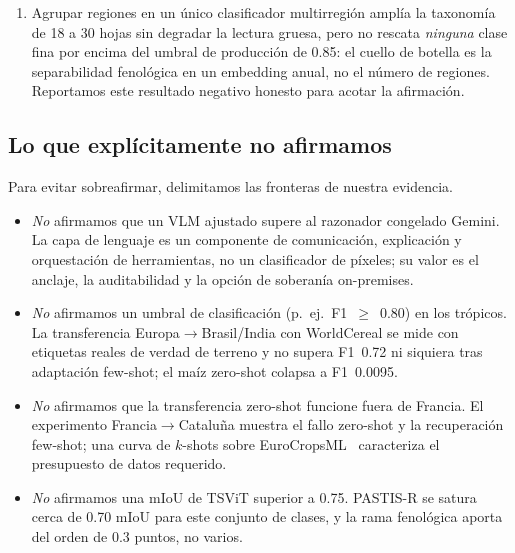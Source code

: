 \begin{enumerate}[leftmargin=*]
    reportados~\cite{harvesting2026alphaearth}. Aun así, la transferencia
    \emph{sí} funciona donde la fenología es separable --- el campeón
    entrenado en Francia alcanza F1 macro 0.266 en Baja Sajonia (DE4),
    rescatando los cereales de invierno --- y el modelo de fundación
    reduce el presupuesto de etiquetas few-shot en aproximadamente un
    orden de magnitud (AlphaEarth supera a Sentinel-2 crudo en $+0.111$ de
    F1 con $k{=}1$ en EuroCropsML LV$\rightarrow$EE).
    \item Agrupar regiones en un único clasificador multirregión amplía la
    taxonomía de 18 a 30 hojas sin degradar la lectura gruesa, pero no
    rescata \emph{ninguna} clase fina por encima del umbral de producción
    de 0.85: el cuello de botella es la separabilidad fenológica en un
    embedding anual, no el número de regiones. Reportamos este resultado
    negativo honesto para acotar la afirmación.
\end{enumerate}

\subsection{Lo que explícitamente no afirmamos}
Para evitar sobreafirmar, delimitamos las fronteras de nuestra
evidencia.
\begin{itemize}[leftmargin=*]
    \item \emph{No} afirmamos que un VLM ajustado supere al razonador
    congelado Gemini. La capa de lenguaje es un componente de
    comunicación, explicación y orquestación de herramientas, no un
    clasificador de píxeles; su valor es el anclaje, la auditabilidad y
    la opción de soberanía on-premises.
    \item \emph{No} afirmamos un umbral de clasificación
    (p.\ ej.\ F1~$\geq$~0.80) en los trópicos. La transferencia
    Europa$\rightarrow$Brasil/India con WorldCereal se mide con etiquetas
    reales de verdad de terreno y no supera F1~0.72 ni siquiera tras
    adaptación few-shot; el maíz zero-shot colapsa a F1~0.0095.
    \item \emph{No} afirmamos que la transferencia zero-shot funcione
    fuera de Francia. El experimento Francia$\rightarrow$Cataluña muestra
    el fallo zero-shot y la recuperación few-shot; una curva de
    $k$-shots sobre EuroCropsML~\cite{reuss2025eurocropsml} caracteriza
    el presupuesto de datos requerido.
    \item \emph{No} afirmamos una mIoU de TSViT superior a 0.75. PASTIS-R
    se satura cerca de 0.70 mIoU para este conjunto de clases, y la rama
    fenológica aporta del orden de $0.3$ puntos, no varios.
\end{itemize}

